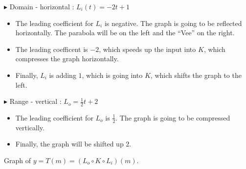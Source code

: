 \documentclass{ximera}
\begin{document}
$\blacktriangleright$ Domain - horizontal : $L_i(t) = -2t + 1$


\begin{itemize}
\item The leading coefficient for $L_i$ is negative.  The graph is going to be reflected horizontally. 
The parabola will be on the left and the ``Vee'' on the right.
\item The leading coefficent is $-2$, which speeds up the input into $K$, which compresses the graph horizontally.
\item Finally, $L_i$ is adding $1$, which is going into $K$, which shifts the graph to the left.

\end{itemize}





$\blacktriangleright$ Range - vertical : $L_o = \frac{1}{2}t + 2$


\begin{itemize}
\item The leading coefficient for $L_o$ is $\frac{1}{2}$.  The graph is going to be compressed vertically. 
\item Finally, the graph will be shifted up $2$.

\end{itemize}


Graph of $ y = T(m) = (L_o \circ K \circ L_i)(m)$.
\end{document}
